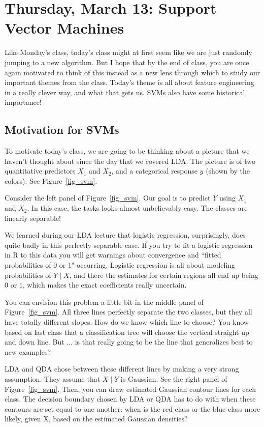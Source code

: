 \section{Thursday, March 13: Support Vector Machines}

Like Monday's class, today's class might at first seem like we are just randomly jumping to a new algorithm. But I hope that by the end of class, you are once again motivated to think of this instead as a new lens through which to study our important themes from the class. Today's theme is all about feature engineering in a really clever way, and what that gets us. SVMs also have some historical importance! 

\subsection{Motivation for SVMs}

To motivate today's class, we are going to be thinking about a picture that we haven't thought about since the day that we covered LDA. The picture is of two quantitative predictors $X_1$ and $X_2$, and a categorical response $y$ (shown by the colors). See Figure~\ref{fig_svm}.

Consider the left panel of Figure~\ref{fig_svm}. Our goal is to predict $Y$ using $X_1$ and $X_2$. In this case, the tasks looks almost unbelievably easy. The classes are linearly separable! 

We learned during our LDA lecture that logistic regression, surprisingly, does quite badly in this perfectly separable case. If you try to fit a logistic regression in R to this data you will get warnings about convergence and ``fitted probabilities of 0 or 1" occurring. Logistic regression is all about modeling probabilities of $Y \mid X$, and there the estimates for certain regions all end up being $0$ or $1$, which makes the exact coefficients really uncertain. 

You can envision this problem a little bit in the middle panel of Figure~\ref{fig_svm}. All three lines perfectly separate the two classes, but they all have totally different slopes. How do we know which line to choose? You know based on last class that a classification tree will choose the vertical straight up and down line. But ... is that really going to be the line that generalizes best to new examples? 

LDA and QDA chose between these different lines by making a very strong assumption. They assume that $X \mid Y$ is Gaussian. See the right panel of Figure~\ref{fig_svm}. Then, you can draw estimated Gaussian contour lines for each class. The decision boundary chosen by LDA or QDA has to do with when these contours are set equal to one another: when is the red class or the blue class more likely, given X, based on the estimated Gaussian densities?  

